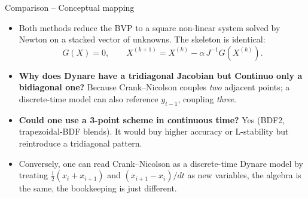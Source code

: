 \documentclass[11pt,aspectratio=169]{beamer}
\begin{document}
\begin{frame}{Comparison -- Conceptual mapping}

\begin{itemize}

\item Both methods reduce the BVP to a square non-linear system
  solved by Newton on a stacked vector of unknowns. The skeleton is
  identical:
  \[
  G(X) = 0,
  \qquad
  X^{(k+1)} = X^{(k)} - \alpha\,J^{-1} G(X^{(k)}).
  \]

\item \textbf{Why does Dynare have a tridiagonal Jacobian but
  Continuo only a bidiagonal one?} Because Crank--Nicolson
  couples \emph{two} adjacent points; a discrete-time model can also
  reference $y_{t-1}$, coupling \emph{three}.\newline

\item \textbf{Could one use a 3-point scheme in continuous time?} Yes
  (BDF2, trapezoidal-BDF blends). It would buy higher accuracy or
  L-stability but reintroduce a tridiagonal pattern.\newline

\item Conversely, one can read Crank--Nicolson as a discrete-time
  Dynare model by treating $\tfrac12(x_i+x_{i+1})$ and
  $(x_{i+1}-x_i)/dt$ as new variables, the algebra is the same,
  the bookkeeping is just different.

\end{itemize}

\end{frame}
\end{document}
